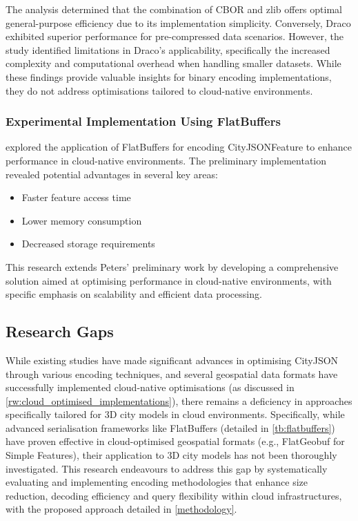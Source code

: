The analysis determined that the combination of CBOR and zlib offers optimal general-purpose efficiency due to its implementation simplicity. Conversely, Draco exhibited superior performance for pre-compressed data scenarios. However, the study identified limitations in Draco's applicability, specifically the increased complexity and computational overhead when handling smaller datasets. While these findings provide valuable insights for binary encoding implementations, they do not address optimisations tailored to cloud-native environments.

\subsubsection{Experimental Implementation Using FlatBuffers}
\label{rw:cityjson_enhancements:performance:flatbuffers}
\citet{ravi_peters_2024_citybuf} explored the application of FlatBuffers \citep{flatbuffers} for encoding CityJSONFeature to enhance performance in cloud-native environments. The preliminary implementation revealed potential advantages in several key areas:

\begin{itemize}
  \item Faster feature access time
  \item Lower memory consumption
  \item Decreased storage requirements
\end{itemize}

This research extends Peters' preliminary work by developing a comprehensive solution aimed at optimising performance in cloud-native environments, with specific emphasis on scalability and efficient data processing.

\subsection{Research Gaps}
\label{rw:research_gaps}
While existing studies have made significant advances in optimising CityJSON through various encoding techniques, and several geospatial data formats have successfully implemented cloud-native optimisations (as discussed in \autoref{rw:cloud_optimised_implementations}), there remains a deficiency in approaches specifically tailored for 3D city models in cloud environments. Specifically, while advanced serialisation frameworks like FlatBuffers (detailed in \autoref{tb:flatbuffers}) have proven effective in cloud-optimised geospatial formats (e.g., FlatGeobuf for Simple Features), their application to 3D city models has not been thoroughly investigated. This research endeavours to address this gap by systematically evaluating and implementing encoding methodologies that enhance size reduction, decoding efficiency and query flexibility within cloud infrastructures, with the proposed approach detailed in \autoref{methodology}.

